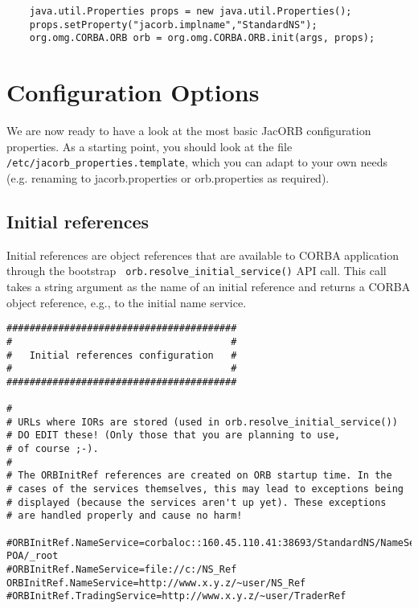 \small{
\begin{verbatim}
    java.util.Properties props = new java.util.Properties();
    props.setProperty("jacorb.implname","StandardNS");
    org.omg.CORBA.ORB orb = org.omg.CORBA.ORB.init(args, props);
\end{verbatim}
}

\section{Configuration Options}

We are now ready to have a look at the most basic JacORB configuration
properties. As a starting point, you should look at the file {\tt
  /etc/jacorb\_properties.template}, which you can adapt to your own
needs (e.g. renaming to jacorb.properties or orb.properties as required).

\subsection{Initial references}

Initial references are object references that are available to CORBA
application through the bootstrap {\tt
  orb.resolve\_initial\_service()} API call. This call takes a string
argument as the name of an initial reference and returns a CORBA
object reference, e.g., to the initial name service.

\renewcommand{\baselinestretch}{0.9}
\small{
\begin{verbatim}
########################################
#                                      #
#   Initial references configuration   #
#                                      #
########################################

#
# URLs where IORs are stored (used in orb.resolve_initial_service())
# DO EDIT these! (Only those that you are planning to use,
# of course ;-).
#
# The ORBInitRef references are created on ORB startup time. In the
# cases of the services themselves, this may lead to exceptions being
# displayed (because the services aren't up yet). These exceptions
# are handled properly and cause no harm!

#ORBInitRef.NameService=corbaloc::160.45.110.41:38693/StandardNS/NameServer-POA/_root
#ORBInitRef.NameService=file://c:/NS_Ref
ORBInitRef.NameService=http://www.x.y.z/~user/NS_Ref
#ORBInitRef.TradingService=http://www.x.y.z/~user/TraderRef
\end{verbatim}
}
\renewcommand{\baselinestretch}{1.0}
\small\normalsize

